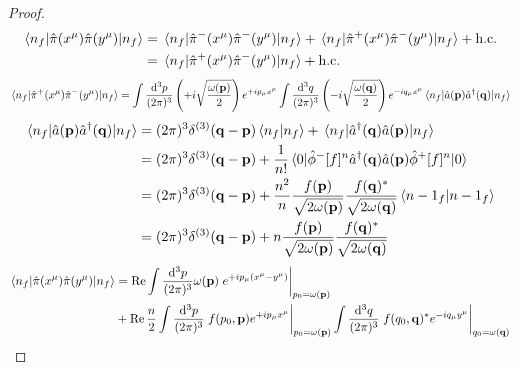 \begin{proof}
	\begin{equation*}
		\begin{split}
			\expval{\hat\pi(x^\mu)\hat\pi(y^\mu)}{n_f}
			&=
			\expval{\hat\pi^-(x^\mu)\hat\pi^-(y^\mu)}{n_f}
			+
			\expval{\hat\pi^+(x^\mu)\hat\pi^-(y^\mu)}{n_f}
			+
			\text{h.c.}
			\\
			&=
			\expval{\hat\pi^+(x^\mu)\hat\pi^-(y^\mu)}{n_f}
			+
			\text{h.c.}
		\end{split}
	\end{equation*}
	\begin{equation*}
		\expval{\hat\pi^+(x^\mu)\hat\pi^-(y^\mu)}{n_f}
		=
		\int\frac{\dd[3]{p}}{(2\pi)^3}
		\left(+i\sqrt{\frac{\omega(\vb{p})}{2}}\right)
		e^{+ip_\mu x^\mu}
		\int\frac{\dd[3]{q}}{(2\pi)^3}
		\left(-i\sqrt{\frac{\omega(\vb{q})}{2}}\right)
		e^{-iq_\mu x^\mu}
		\expval{\hat{a}(\vb{p})\hat{a}^\dagger(\vb{q})}{n_f}
	\end{equation*}
	\begin{equation*}
		\begin{split}
			\expval{\hat{a}(\vb{p})\hat{a}^\dagger(\vb{q})}{n_f}
			&=
			(2\pi)^3\delta^{(3)}(\vb{q}-\vb{p})
			\braket{n_f}
			+
			\expval{\hat{a}^\dagger(\vb{q})\hat{a}(\vb{p})}{n_f}
			\\
			&=
			(2\pi)^3\delta^{(3)}(\vb{q}-\vb{p})
			+
			\frac{1}{n!}
			\expval{
				\hat\phi^-[f]^n
				\hat{a}^\dagger(\vb{q})
				\hat{a}(\vb{p})
				\hat\phi^+[f]^n
			}{0}
			\\
			&=
			(2\pi)^3\delta^{(3)}(\vb{q}-\vb{p})
			+
			\frac{n^2}{n}
			\frac{f(\vb{p})}{\sqrt{2\omega(\vb{p})}}
			\frac{f(\vb{q})^*}{\sqrt{2\omega(\vb{q})}}
			\braket{n-1_f}
			\\
			&=
			(2\pi)^3\delta^{(3)}(\vb{q}-\vb{p})
			+
			n
			\frac{f(\vb{p})}{\sqrt{2\omega(\vb{p})}}
			\frac{f(\vb{q})^*}{\sqrt{2\omega(\vb{q})}}
		\end{split}
	\end{equation*}
	\begin{equation*}
		\begin{split}
			\expval{\hat\pi(x^\mu)\hat\pi(y^\mu)}{n_f}
			&=
			\Re
			\int\frac{\dd[3]{p}}{(2\pi)^3}
			\omega(\vb{p})
			\eval{e^{+ip_\mu(x^\mu-y^\mu)}}_{p_0=\omega(\vb{p})}
			\\
			&+
			\Re
			\frac{n}{2}
			\int\frac{\dd[3]{p}}{(2\pi)^3}
			\eval{
				f(p_0,\vb{p})
				e^{+ip_\mu x^\mu}
			}_{p_0=\omega(\vb{p})}
			\int\frac{\dd[3]{q}}{(2\pi)^3}
			\eval{
				f(q_0,\vb{q})^*
				e^{-iq_\mu y^\mu}
			}_{q_0=\omega(\vb{q})}
		\end{split}
	\end{equation*}
\end{proof}

